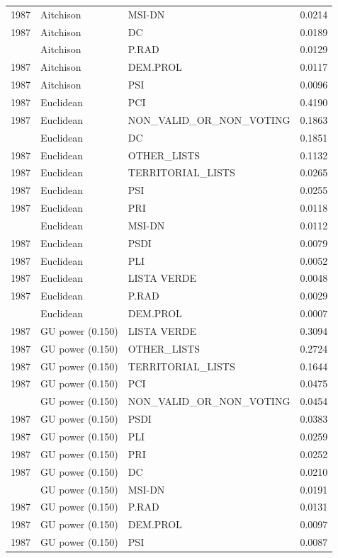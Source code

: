 \begin{longtable}[t]{rllr}
1987 & Aitchison & MSI-DN & 0.0214\\
1987 & Aitchison & DC & 0.0189\\
\addlinespace
1987 & Aitchison & P.RAD & 0.0129\\
1987 & Aitchison & DEM.PROL & 0.0117\\
1987 & Aitchison & PSI & 0.0096\\
1987 & Euclidean & PCI & 0.4190\\
1987 & Euclidean & NON\_VALID\_OR\_NON\_VOTING & 0.1863\\
\addlinespace
1987 & Euclidean & DC & 0.1851\\
1987 & Euclidean & OTHER\_LISTS & 0.1132\\
1987 & Euclidean & TERRITORIAL\_LISTS & 0.0265\\
1987 & Euclidean & PSI & 0.0255\\
1987 & Euclidean & PRI & 0.0118\\
\addlinespace
1987 & Euclidean & MSI-DN & 0.0112\\
1987 & Euclidean & PSDI & 0.0079\\
1987 & Euclidean & PLI & 0.0052\\
1987 & Euclidean & LISTA VERDE & 0.0048\\
1987 & Euclidean & P.RAD & 0.0029\\
\addlinespace
1987 & Euclidean & DEM.PROL & 0.0007\\
1987 & GU power (0.150) & LISTA VERDE & 0.3094\\
1987 & GU power (0.150) & OTHER\_LISTS & 0.2724\\
1987 & GU power (0.150) & TERRITORIAL\_LISTS & 0.1644\\
1987 & GU power (0.150) & PCI & 0.0475\\
\addlinespace
1987 & GU power (0.150) & NON\_VALID\_OR\_NON\_VOTING & 0.0454\\
1987 & GU power (0.150) & PSDI & 0.0383\\
1987 & GU power (0.150) & PLI & 0.0259\\
1987 & GU power (0.150) & PRI & 0.0252\\
1987 & GU power (0.150) & DC & 0.0210\\
\addlinespace
1987 & GU power (0.150) & MSI-DN & 0.0191\\
1987 & GU power (0.150) & P.RAD & 0.0131\\
1987 & GU power (0.150) & DEM.PROL & 0.0097\\
1987 & GU power (0.150) & PSI & 0.0087\\

\end{longtable}
